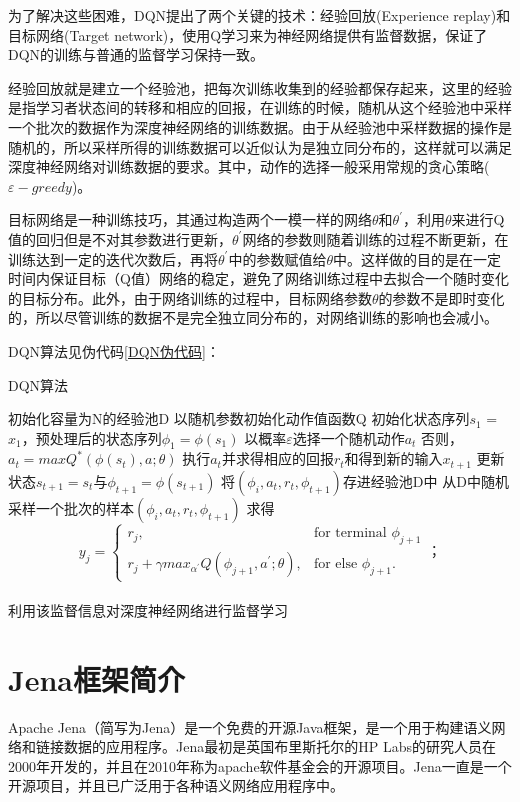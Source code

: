 为了解决这些困难，DQN提出了两个关键的技术：经验回放(Experience replay)和目标网络(Target network)，使用Q学习来为神经网络提供有监督数据，保证了DQN的训练与普通的监督学习保持一致。

经验回放就是建立一个经验池，把每次训练收集到的经验都保存起来，这里的经验是指学习者状态间的转移和相应的回报，在训练的时候，随机从这个经验池中采样一个批次的数据作为深度神经网络的训练数据。由于从经验池中采样数据的操作是随机的，所以采样所得的训练数据可以近似认为是独立同分布的，这样就可以满足深度神经网络对训练数据的要求。其中，动作的选择一般采用常规的贪心策略($\varepsilon-greedy$)。

目标网络是一种训练技巧，其通过构造两个一模一样的网络$\theta$和$\theta^{'}$，利用$\theta$来进行Q值的回归但是不对其参数进行更新，$\theta^{'}$网络的参数则随着训练的过程不断更新，在训练达到一定的迭代次数后，再将$\theta^{'}$中的参数赋值给$\theta$中。这样做的目的是在一定时间内保证目标（Q值）网络的稳定，避免了网络训练过程中去拟合一个随时变化的目标分布。此外，由于网络训练的过程中，目标网络参数$\theta$的参数不是即时变化的，所以尽管训练的数据不是完全独立同分布的，对网络训练的影响也会减小。

DQN算法见伪代码\ref{DQN伪代码}：
\begin{algorithm}
    \caption{DQN算法}
    \label{DQN伪代码}    
    初始化容量为N的经验池D\;
    以随机参数初始化动作值函数Q\;
    {
        初始化状态序列$s_1$ = {$x_1$}，预处理后的状态序列$\phi_1 = \phi(s_1) $\;
        {
            以概率$\varepsilon$选择一个随机动作$a_t$\;
            否则，$a_t = maxQ^*(\phi(s_t),a;\theta)$\;
            执行$a_t$并求得相应的回报$r_t$和得到新的输入$x_{t+1}$\;
            更新状态$s_{t+1}=s_t$与$\phi_{t+1} = \phi(s_{t+1})$\;
            将$(\phi_i,a_t,r_t,\phi_{t+1})$存进经验池D中\;
            从D中随机采样一个批次的样本$(\phi_i,a_t,r_t,\phi_{t+1})$\;
            求得
            \[
                y_j = \begin{cases}
                    r_j,& \text{for terminal }\phi_{j+1}\\
                    r_j+\gamma max_{\alpha^{'}}Q(\phi_{j+1},a^{'};\theta), & \text{for else } \phi_{j+1}.
                \end{cases}；
            \]\\
            利用该监督信息对深度神经网络进行监督学习\;
        }            
    }
\end{algorithm} 

\section{Jena框架简介}
Apache Jena（简写为Jena）是一个免费的开源Java框架，是一个用于构建语义网络和链接数据的应用程序。Jena最初是英国布里斯托尔的HP Labs的研究人员在2000年开发的，并且在2010年称为apache软件基金会的开源项目。Jena一直是一个开源项目，并且已广泛用于各种语义网络应用程序中。

